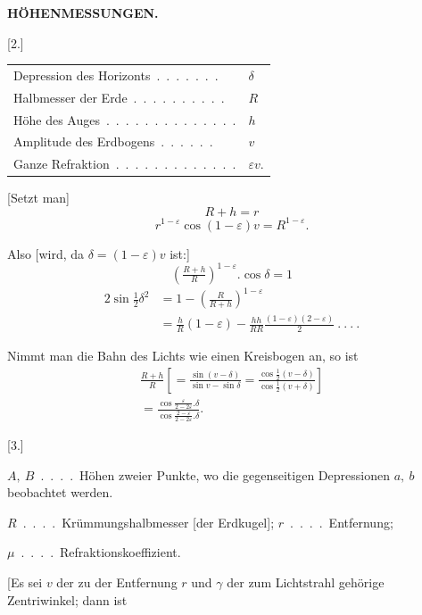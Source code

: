 \par\clearpage
\noindent\null\hfill{\small\textbf{HÖHENMESSUNGEN.}}\hfill{}\par\medskip
\begingroup
\setlength{\abovedisplayskip}{5pt}\setlength{\belowdisplayskip}{5pt}
\begin{center}
[2.]\par\medskip
\begin{tabular}{l@{\ }l}
Depression des Horizonts\ .\ .\ .\ .\ .\ .\ .&\(\delta\)\\
Halbmesser der Erde\ .\ .\ .\ .\ .\ .\ .\ .\ .\ .&\(R\)\\
Höhe des Auges\ .\ .\ .\ .\ .\ .\ .\ .\ .\ .\ .\ .\ .\ .&\(h\)\\
Amplitude des Erdbogens\ .\ .\ .\ .\ .\ .&\(v\)\\
Ganze Refraktion\ .\ .\ .\ .\ .\ .\ .\ .\ .\ .\ .\ .\ .&\(\varepsilon v\).
\end{tabular}
\end{center}
\par\noindent\hspace*{\parindent}[Setzt man]
\[R+h=r\]
\noindent [so ist:]
\[r^{1-\varepsilon}\cos(1-\varepsilon)v=R^{1-\varepsilon}.\]
\par\noindent\hspace*{\parindent}Also [wird, da \(\delta=(1-\varepsilon)v\) ist:]
\[\left(\tfrac{R+h}{R}\right)^{1-\varepsilon}.\cos\delta=1\]
\noindent [oder]
\[\begin{aligned}
2\sin\tfrac12\delta^2&=1-\left(\tfrac{R}{R+h}\right)^{1-\varepsilon}\\
&=\tfrac{h}{R}(1-\varepsilon)-\tfrac{hh}{RR}\tfrac{(1-\varepsilon)(2-\varepsilon)}{2}\ .\ .\ .\ .
\end{aligned}\]
\par\noindent\hspace*{\parindent}Nimmt man die Bahn des Lichts wie einen Kreisbogen an, so ist
\[\begin{aligned}
\tfrac{R+h}{R}\left[=\tfrac{\sin(v-\delta)}{\sin v-\sin\delta}=\tfrac{\cos\frac12(v-\delta)}{\cos\frac12(v+\delta)}\right]\\
=\frac{\cos\tfrac{\varepsilon}{2-2\varepsilon}.\delta}{\cos\tfrac{2-\varepsilon}{2-2\varepsilon}.\delta}.
\end{aligned}\]
\begin{center}[3.]\end{center}
\par\noindent\hspace*{\parindent}\(A,\ B\)\ .\ .\ .\ .\ Höhen zweier Punkte, wo die gegenseitigen Depressionen
\(a,\ b\) beobachtet werden.
\par\noindent\hspace*{\parindent}\(R\)\ .\ .\ .\ .\ Krümmungshalbmesser [der Erdkugel]; \(r\)\ .\ .\ .\ .\ Entfernung;
\begin{center}\(\mu\)\ .\ .\ .\ .\ Refraktionskoeffizient.\end{center}
\par\noindent\hspace*{\parindent}[Es sei \(v\) der zu der Entfernung \(r\) und \(\gamma\) der zum Lichtstrahl gehörige
Zentriwinkel; dann ist
\endgroup

